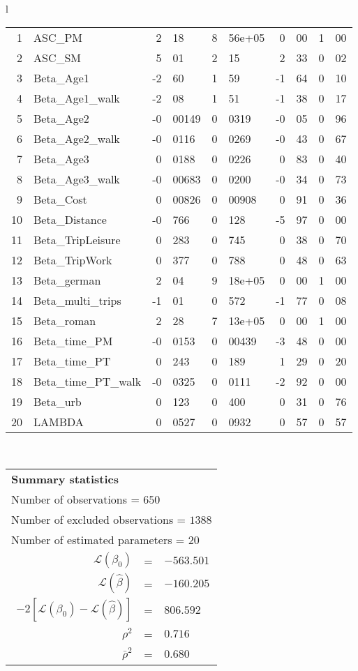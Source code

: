 \begin{tabular}{l}
\begin{tabular}{rlr@{.}lr@{.}lr@{.}lr@{.}l}
1 & ASC_PM  & 2&18 & 8&56e+05 & 0&00 & 1&00\\
2 & ASC_SM & 5&01 & 2&15 & 2&33 & 0&02\\
3 & Beta_Age1 & -2&60 & 1&59 & -1&64 & 0&10\\
4 & Beta_Age1_walk & -2&08 & 1&51 & -1&38 & 0&17\\
5 & Beta_Age2 & -0&00149 & 0&0319 & -0&05 & 0&96\\
6 & Beta_Age2_walk & -0&0116 & 0&0269 & -0&43 & 0&67\\
7 & Beta_Age3 & 0&0188 & 0&0226 & 0&83 & 0&40\\
8 & Beta_Age3_walk & -0&00683 & 0&0200 & -0&34 & 0&73\\
9 & Beta_Cost & 0&00826 & 0&00908 & 0&91 & 0&36\\
10 & Beta_Distance & -0&766 & 0&128 & -5&97 & 0&00\\
11 & Beta_TripLeisure & 0&283 & 0&745 & 0&38 & 0&70\\
12 & Beta_TripWork & 0&377 & 0&788 & 0&48 & 0&63\\
13 & Beta_german & 2&04 & 9&18e+05 & 0&00 & 1&00\\
14 & Beta_multi_trips & -1&01 & 0&572 & -1&77 & 0&08\\
15 & Beta_roman & 2&28 & 7&13e+05 & 0&00 & 1&00\\
16 & Beta_time_PM & -0&0153 & 0&00439 & -3&48 & 0&00\\
17 & Beta_time_PT & 0&243 & 0&189 & 1&29 & 0&20\\
18 & Beta_time_PT_walk & -0&0325 & 0&0111 & -2&92 & 0&00\\
19 & Beta_urb & 0&123 & 0&400 & 0&31 & 0&76\\
20 & LAMBDA & 0&0527 & 0&0932 & 0&57 & 0&57\\
\hline
\end{tabular}
\\
\begin{tabular}{rcl}
\multicolumn{3}{l}{\bf Summary statistics}\\
\multicolumn{3}{l}{ Number of observations = $650$} \\
\multicolumn{3}{l}{ Number of excluded observations = $1388$} \\
\multicolumn{3}{l}{ Number of estimated  parameters = $20$} \\
 $\mathcal{L}(\beta_0)$ &=&  $-563.501$ \\
 $\mathcal{L}(\hat{\beta})$ &=& $-160.205 $  \\
 $-2[\mathcal{L}(\beta_0) -\mathcal{L}(\hat{\beta})]$ &=& $806.592$ \\
    $\rho^2$ &=&   $0.716$ \\
    $\bar{\rho}^2$ &=&    $0.680$ \\
\end{tabular}
  \end{tabular}
